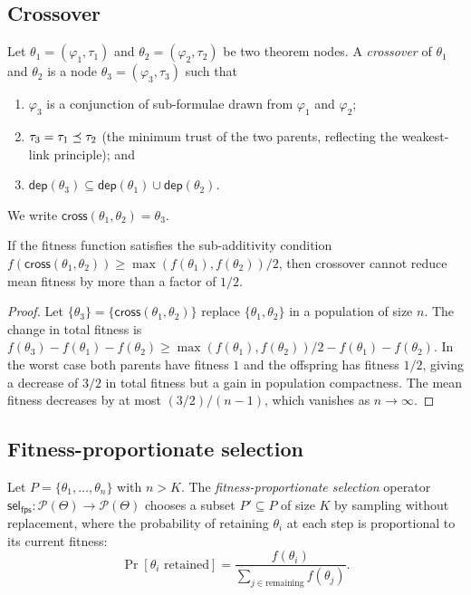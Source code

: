 \documentclass[11pt]{article}
\providecommand{\fit}{f}                    %
\providecommand{\Cap}{K}                    %
\providecommand{\sel}{\mathsf{sel}}         %
\providecommand{\cross}{\mathsf{cross}}     %
\providecommand{\dep}{\mathsf{dep}}         %
\providecommand{\fitprop}{\mathsf{fps}}     %
\begin{document}
\subsection{Crossover}

\begin{definition}[Crossover]\label{def:cross}
Let $\theta_1 = (\varphi_1, \tau_1)$ and $\theta_2 = (\varphi_2,
\tau_2)$ be two theorem nodes.  A \emph{crossover} of $\theta_1$ and
$\theta_2$ is a node $\theta_3 = (\varphi_3, \tau_3)$ such that
\begin{enumerate}[leftmargin=1.5em]
  \item $\varphi_3$ is a conjunction of sub-formulae drawn from
    $\varphi_1$ and $\varphi_2$;
  \item $\tau_3 = \tau_1 \preceq \tau_2$ (\ie the minimum trust of
    the two parents, reflecting the weakest-link principle); and
  \item $\dep(\theta_3) \subseteq \dep(\theta_1) \cup \dep(\theta_2)$.
\end{enumerate}
We write $\cross(\theta_1, \theta_2) = \theta_3$.
\end{definition}

\begin{proposition}\label{prop:cross-fit}
If the fitness function satisfies the sub-additivity condition
$\fit(\cross(\theta_1,\theta_2)) \geq \max(\fit(\theta_1),\fit(\theta_2)) / 2$,
then crossover cannot reduce mean fitness by more than a factor of
$1/2$.
\end{proposition}
\begin{proof}
Let $\{\theta_3\} = \{\cross(\theta_1,\theta_2)\}$ replace
$\{\theta_1,\theta_2\}$ in a population of size $n$.  The change in
total fitness is $\fit(\theta_3) - \fit(\theta_1) - \fit(\theta_2)
\geq \max(\fit(\theta_1),\fit(\theta_2))/2 - \fit(\theta_1)
- \fit(\theta_2)$.  In the worst case both parents have fitness $1$
and the offspring has fitness $1/2$, giving a decrease of $3/2$ in
total fitness but a gain in population compactness.  The mean fitness
decreases by at most $(3/2)/(n-1)$, which vanishes as $n \to \infty$.
\end{proof}

\subsection{Fitness-proportionate selection}

\begin{definition}\label{def:fps}
Let $P = \{\theta_1, \ldots, \theta_n\}$ with $n > \Cap$.  The
\emph{fitness-proportionate selection} operator
$\sel_{\fitprop} : \mathcal{P}(\Theta) \to \mathcal{P}(\Theta)$
chooses a subset $P' \subseteq P$ of size $\Cap$ by sampling without
replacement, where the probability of retaining $\theta_i$ at each
step is proportional to its current fitness:
\[
  \Pr[\theta_i \text{ retained}]
  = \frac{\fit(\theta_i)}{\sum_{j \in \text{remaining}} \fit(\theta_j)}.
\]
\end{definition}
\end{document}

